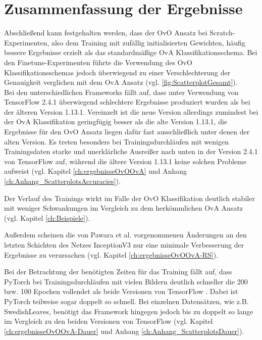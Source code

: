 \section{Zusammenfassung der Ergebnisse}
Abschließend kann festgehalten werden, dass der OvO Ansatz bei Scratch-Experimenten, also dem Training mit zufällig initialisierten Gewichten, häufig bessere Ergebnisse erzielt als das standardmäßige OvA Klassifikationsschema. Bei den Finetune-Experimenten führte die Verwendung des OvO Klassifikationsschemas jedoch überwiegend zu einer Verschlechterung der Genauigkeit verglichen mit dem OvA Ansatz (vgl. \ref{fig:ScatterplotGesamt}).\\

Bei den unterschiedlichen Frameworks fällt auf, dass unter Verwendung von TensorFlow 2.4.1 \cite{tensorflow} überwiegend schlechtere Ergebnisse produziert wurden als bei der älteren Version 1.13.1. Vereinzelt ist die neue Version allerdings zumindest bei der OvA Klassifikation geringfügig besser als die alte Version 1.13.1, die Ergebnisse für den OvO Ansatz liegen dafür fast ausschließlich unter denen der alten Version. Es treten besonders bei Trainingsdurchläufen mit wenigen Trainingsdaten starke und unerklärliche Ausreißer nach unten in der Version 2.4.1 von TensorFlow \cite{tensorflow} auf, während die ältere Version 1.13.1 keine solchen Probleme aufweist (vgl. Kapitel \ref{ch:ergebnisseOvOOvA} und Anhang \ref{ch:Anhang_ScatterplotsAccuracies}).

Der Verlauf des Trainings wirkt im Falle der OvO Klassifikation deutlich stabiler mit weniger Schwankungen im Vergleich zu dem herkömmlichen OvA Ansatz (vgl. Kapitel \ref{ch:Beispiele}).

Außerdem scheinen die von Pawara et al. \cite{pawaraWebsiteCode} vorgenommenen Änderungen an den letzten Schichten des Netzes InceptionV3 nur eine minimale Verbesserung der Ergebnisse zu verursachen (vgl. Kapitel \ref{ch:ergebnisseOvOOvA-RS}).

Bei der Betrachtung der benötigten Zeiten für das Training fällt auf, dass PyTorch \cite{pytorch} bei Trainingsdurchläufen mit vielen Bildern deutlich schneller die 200 bzw. 100 Epochen vollendet als beide Versionen von TensorFlow \cite{tensorflow}. Dabei ist PyTorch \cite{pytorch} teilweise sogar doppelt so schnell. Bei einzelnen Datensätzen, wie z.B. SwedishLeaves, benötigt das Framework hingegen jedoch bis zu doppelt so lange im Vergleich zu den beiden Versionen von TensorFlow \cite{tensorflow} (vgl. Kapitel \ref{ch:ergebnisseOvOOvA-Dauer} und Anhang \ref{ch:Anhang_ScatterplotsDauer}).\\\\
